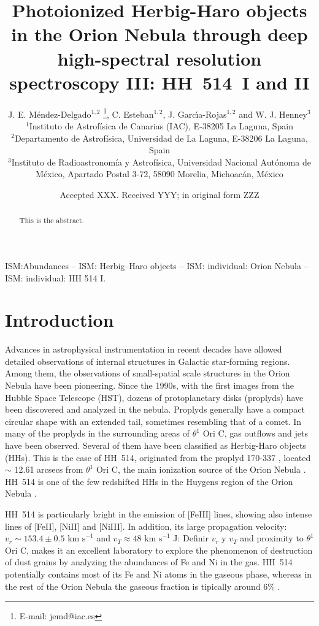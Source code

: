 \documentclass[fleqn,usenatbib]{mnras}
\title[HH~514~I and II in the Orion Nebula]{Photoionized Herbig-Haro objects in the Orion Nebula through deep high-spectral resolution spectroscopy III: HH~514~I and II}
\author[J. E. M\'endez-Delgado et al.]
{J. E. M\'endez-Delgado$^{1,2}$ \thanks{E-mail: jemd@iac.es},
C. Esteban$^{1,2}$, J. Garc{\'{\i}}a-Rojas$^{1,2}$ and W. J. Henney$^{3}$  
\\
$^{1}$Instituto de Astrof\'isica de Canarias (IAC), E-38205 La Laguna, Spain\\
$^{2}$Departamento de Astrof\'isica, Universidad de La Laguna, E-38206 La Laguna, Spain\\
$^{3}$Instituto de Radioastronom\'ia y Astrof\'isica, Universidad Nacional Aut\'onoma de M\'exico, Apartado Postal 3-72, 58090 Morelia, Michoac\'an, M\'exico}
\date{Accepted XXX. Received YYY; in original form ZZZ}
\newcommand{\jorge}[1]{{\color{magenta}J: #1}}
\begin{document}
\label{firstpage}
\pagerange{\pageref{firstpage}--\pageref{lastpage}}
\maketitle

\begin{abstract}
This is the abstract. 
\end{abstract}

\begin{keywords}
ISM:Abundances – ISM: Herbig–Haro objects – ISM: individual:
Orion Nebula – ISM: individual: HH 514 I.
\end{keywords}



\section{Introduction}
\label{sec:introduction}

Advances in astrophysical instrumentation in recent decades have allowed detailed observations of internal structures in Galactic star-forming regions. Among them, the observations of small-spatial scale structures in the Orion Nebula have been pioneering. Since the 1990s, with the first images from the Hubble Space Telescope (HST), dozens of protoplanetary disks (proplyds) \citep[][]{Odell1993} have been discovered and analyzed in the nebula. Proplyds generally have a compact circular shape with an extended tail, sometimes resembling that of a comet. In many of the proplyds in the surrounding areas of $\theta^1$ Ori C, gas outflows and jets have been observed. Several of them have been classified as Herbig-Haro objects (HHs). This is the case of HH~514, originated from the proplyd 170-337 \citep[][]{bally00}, located $\sim$ 12.61 arcsecs from $\theta^1$ Ori C, the main ionization source of the Orion Nebula \citep[][]{ODell2017}. HH~514 is one of the few redshifted HHs in the Huygens region of the Orion Nebula \citep[][]{odellyhenney08}.

HH~514 is particularly bright in the emission of [Fe\thinspace III] lines, showing also intense lines of  [Fe\thinspace II], [Ni\thinspace II] and [Ni\thinspace III]. In addition, its large propagation velocity: $v_{r} \sim 153.4 \pm 0.5  \text{ km s}^{-1}$ and $ v_{T} \approx 48 \text{ km s}^{-1}$ \citep{odellyhenney08} \jorge{Definir $v_{r}$ y $v_{T}$} and proximity to $\theta^1$ Ori C, makes it an excellent laboratory to explore the phenomenon of destruction of dust grains by analyzing the abundances of Fe and Ni in the gas. HH~514 potentially contains most of its Fe and Ni atoms in the gaseous phase, whereas in the rest of the Orion Nebula the gaseous fraction is tipically around 6\% \citep[][]{mendez2021-2}.
\end{document}
